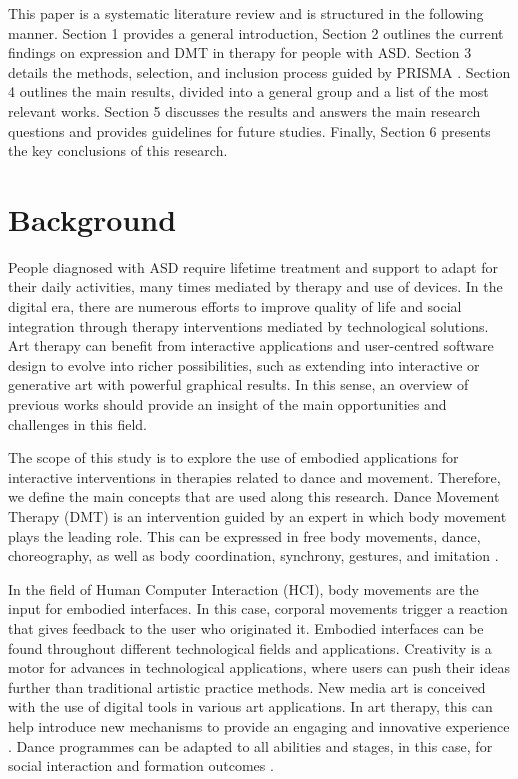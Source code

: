 \documentclass[a4paper,fleqn]{cas-sc}
\begin{document}
This paper is a systematic literature review and is structured in the following manner. Section 1 provides a general introduction, Section 2 outlines the current findings on expression and DMT in therapy for people with ASD. Section 3 details the methods, selection, and inclusion process guided by PRISMA \cite{Pagen71}. Section 4 outlines the main results, divided into a general group and a list of the most relevant works. Section 5 discusses the results and answers the main research questions and provides guidelines for future studies. Finally, Section 6 presents the key conclusions of this research.



\section{Background} 
\label{sec2:bg}
People diagnosed with ASD require lifetime treatment and support to adapt for their daily activities, many times mediated by therapy and use of devices\cite{Lord20}.
 In the digital era, there are numerous efforts to improve quality of life and social integration through therapy interventions mediated by technological solutions. Art therapy can benefit from interactive applications and user-centred software design to evolve into richer possibilities, such as extending into interactive or generative art with powerful graphical results. In this sense, an overview of previous works should provide an insight of the main opportunities and challenges in this field.


The scope of this study is to explore the use of embodied applications for interactive interventions in therapies related to dance and movement. Therefore, we define the main concepts that are used along this research.
Dance Movement Therapy (DMT) is an intervention guided by an expert in which body movement plays the leading role. This can be expressed in free body movements, dance, choreography, as well as body coordination, synchrony, gestures, and imitation \cite{Sheets10}.


In the field of Human Computer Interaction (HCI), body movements are the input for embodied interfaces. In this case, corporal movements trigger a reaction that gives feedback to the user who originated it. Embodied interfaces can be found throughout different technological fields and applications. Creativity is a motor for advances in technological applications, where users can push their ideas further than traditional artistic practice methods. New media art is conceived with the use of digital tools in various art applications. In art therapy, this can help introduce new mechanisms to provide an engaging and innovative experience \cite{Papadopoulou2016}.  Dance programmes can be adapted to all abilities and stages, in this case, for social interaction and formation outcomes 
\cite{Reinders19}.
\end{document}
